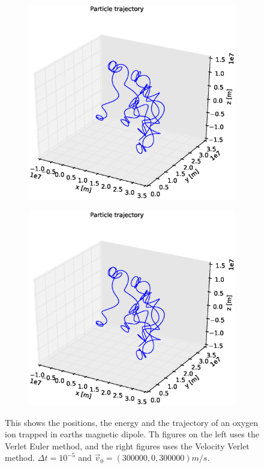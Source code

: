 \documentclass[x11names]{article}
\renewcommand{\va}{\vec}
\begin{document}
\begin{figure}
\begin{subfigure}{0.45\textwidth}
        \includegraphics[width = \textwidth]{figures/ion_8_5_Euler3Dplot}
      \end{subfigure}
      \begin{subfigure}{0.45\textwidth}
        \includegraphics[width = \textwidth]{figures/ion_8_5_Verlet3Dplot}
      \end{subfigure}
    \caption{This shows the positions, the energy and the trajectory of an oxygen ion trapped in earths magnetic dipole. Th figures on the left uses the Verlet Euler method, and the right figures uses the Velocity Verlet method. \(\Delta t = 10^{-5}\) and \(\va{v}_0 = (300000, 0 , 300000) m/s \).}
    \label{fig:high_vel}
    \end{figure}
\end{document}
